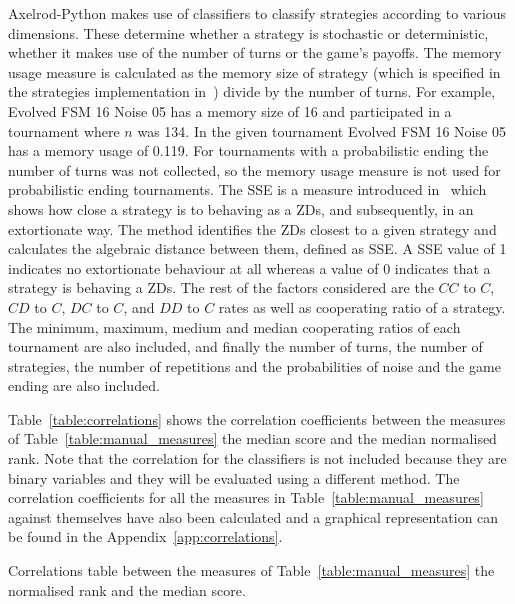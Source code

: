 Axelrod-Python makes use of classifiers to classify strategies according to
various dimensions. These determine whether
a strategy is stochastic or deterministic, whether it makes use of the number of
turns or the game's payoffs. The memory usage measure is calculated as the
memory size of strategy (which is specified in the strategies implementation
in~\cite{axelrodproject}) divide by the number of turns. For example, Evolved
FSM 16 Noise 05 has a memory size of 16 and participated in a tournament where
$n$ was 134. In the given tournament Evolved FSM 16 Noise 05 has a memory usage
of 0.119. For tournaments with a probabilistic ending the number of turns was
not collected, so the memory usage measure is not used for probabilistic ending
tournaments. The SSE is a measure introduced in~\cite{Knight2019} which shows
how close a strategy is to behaving as a ZDs, and subsequently, in an
extortionate way. The method identifies the ZDs closest to a given strategy and
calculates the algebraic distance between them, defined as SSE. A SSE value of 1
indicates no extortionate behaviour at all whereas a value of 0 indicates that a
strategy is behaving a ZDs. The rest of the factors considered are the $CC$ to
$C$, $CD$ to $C$, $DC$ to $C$, and $DD$ to $C$ rates as well as cooperating
ratio of a strategy. The minimum, maximum, medium and median cooperating ratios
of each tournament are also included, and finally the number of turns, the
number of strategies, the number of repetitions and the probabilities of noise
and the game ending are also included.

Table~\ref{table:correlations} shows the correlation coefficients between the
measures of Table~\ref{table:manual_measures} the median score and the median
normalised rank. Note that the correlation for the classifiers is
not included because they are binary variables and they will be evaluated using a
different method. The correlation coefficients for all the measures in
Table~\ref{table:manual_measures} against themselves have also been calculated and a
graphical representation can be found in the Appendix~\ref{app:correlations}.

\begin{table}[!htbp]
    \begin{center}
    \resizebox{.9\textwidth}{!}{
        
    }
\end{center}
\caption{Correlations table between the measures of Table~\ref{table:manual_measures}
the normalised rank and the median score.}\label{table:correlations}
\end{table}

